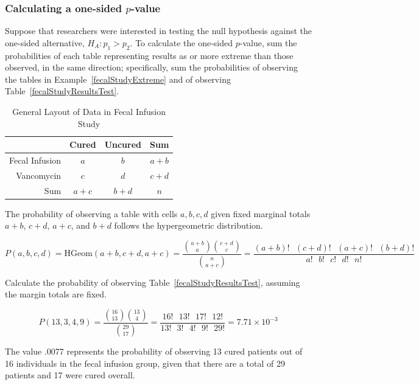 \subsubsection{Calculating a one-sided $p$-value}

Suppose that researchers were interested in testing the null hypothesis against the one-sided alternative, $H_A: p_1 > p_2$. To calculate the one-sided $p$-value, sum the probabilities of each table representing results as or more extreme than those observed, in the same direction; specifically, sum the probabilities of observing the tables in Example~\ref{fecalStudyExtreme} and of observing Table~\ref{fecalStudyResultsTest}.

\begin{table}[h]
	\centering
	\begin{tabular}{rccc}
		\hline
		& Cured & Uncured & Sum \\ 
		\hline
		Fecal Infusion & $a$ & $b$ & $a+b$ \\ 
		Vancomycin & $c$ & $d$ & $c+d$ \\ 
		Sum & $a+c$ & $b+d$ & $n$ \\ 
		\hline
	\end{tabular}
	\caption{General Layout of Data in Fecal Infusion Study} 
	\label{fecalStudyGeneral}
\end{table}


The probability of observing a table with cells $a, b, c, d$ given fixed marginal totals $a+b$, $c+d$, $a + c$, and $b +d$ follows the hypergeometric distribution.

\[P(a,b,c,d) = \text{HGeom}(a+b, c+d, a+c) = \dfrac{ {a+b \choose a} {c+d \choose c}}{{n \choose a+c}} = \dfrac{(a+b)! \text{ } (c+d)! \text{ } (a+c)! \text{ } (b+d)!}{a! \text{ } b! \text{ } c! \text{ } d! \text{ } n!}\]

\begin{example}{Calculate the probability of observing Table~\ref{fecalStudyResultsTest}, assuming the margin totals are fixed.}

\[P(13, 3, 4, 9) = \dfrac{ {16 \choose 13} {13 \choose 4}}{{29 \choose 17}} = \dfrac{16! \text{ } 13! \text{ } 17! \text{ } 12!}{13! \text{ } 3! \text{ } 4! \text{ } 9! \text{ } 29!} = 7.71 \times 10^{-3}\]

The value .0077 represents the probability of observing 13 cured patients out of 16 individuals in the fecal infusion group, given that there are a total of 29 patients and 17 were cured overall.
\end{example}

